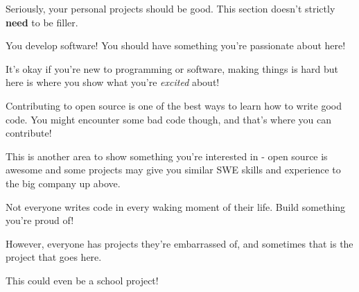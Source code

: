 
\begin{tightemize}
\item Seriously, your personal projects should be good. This section doesn't strictly \textbf{need} to be filler.
\item You develop software! You should have something you're passionate about here!
\item It's okay if you're new to programming or software, making things is hard but here is where you show what you're \textit{excited} about!
\end{tightemize}
\subsectionsep

\begin{tightemize}
\item Contributing to open source is one of the best ways to learn how to write good code. You might encounter some bad code though, and that's where you can contribute!
\item This is another area to show something you're interested in - open source is awesome and some projects may give you similar SWE skills and experience to the big company up above.
\end{tightemize}
\subsectionsep

\begin{tightemize}
\item Not everyone writes code in every waking moment of their life. Build something you're proud of!
\item However, everyone has projects they're embarrassed of, and sometimes that is the project that goes here.
\item This could even be a school project!
\end{tightemize}
